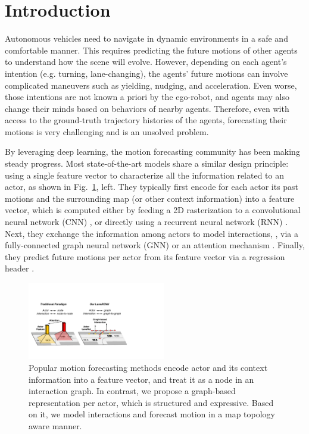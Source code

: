 
\section{Introduction}
Autonomous vehicles need to navigate in dynamic environments in a safe and comfortable manner.  
This requires predicting the future motions of other agents to understand how the 
scene will evolve. 
However, depending on each agent's intention (e.g. turning, lane-changing), the agents' future motions can involve complicated maneuvers such as yielding, nudging, and acceleration.
Even worse, those intentions are not known a priori by the ego-robot, and agents may also change their minds based on behaviors of nearby agents. 
Therefore, even with access to the ground-truth trajectory histories of the agents,
forecasting their motions is very challenging and is an unsolved problem.

By leveraging deep learning, the motion forecasting community has been making steady progress. 
Most state-of-the-art models share a similar design principle: using a single feature
vector to characterize all the information related to an actor, as shown in Fig.~\ref{fig:teaser}, left.
They typically first encode for each actor
its past motions and the surrounding map (or other context information) into a feature
vector, which is computed either by feeding a 2D rasterization to a
convolutional neural network (CNN)
\cite{nmp,dsd,precog,chauffeurnet,covernet,intentnet}, or directly using a
recurrent neural network (RNN)
\cite{matf,mfp,vectornet,tnt,socialgan,sociallstm}.
Next, they exchange the information among actors to model interactions, \eg, via a fully-connected
graph neural network (GNN)
\cite{v2vnet,spagnn,precog,mfp,ilvm,vectornet} or an attention
mechanism \cite{interacttransformer,sophie,socialatt,carnet,mercat2020multi}. 
Finally, they predict future motions per actor from its feature vector
via a regression header \cite{lgn,mfp,precog,nmp,intentnet,pnpnet,attnmp}.



\begin{figure}[t]
\begin{center}
  \includegraphics[height=3.4cm]{figures/teaser.pdf}
\end{center}
\vspace{-0.2cm}
\caption{Popular motion forecasting methods encode actor and its context
information into a feature vector, and treat it as a node in an interaction graph.
In contrast, we propose a graph-based
representation \ROI per actor, which is structured and expressive. Based on
it, we model interactions and forecast motion in a map topology aware manner.}
\vspace{-0.2cm}
\label{fig:teaser}
\end{figure}



